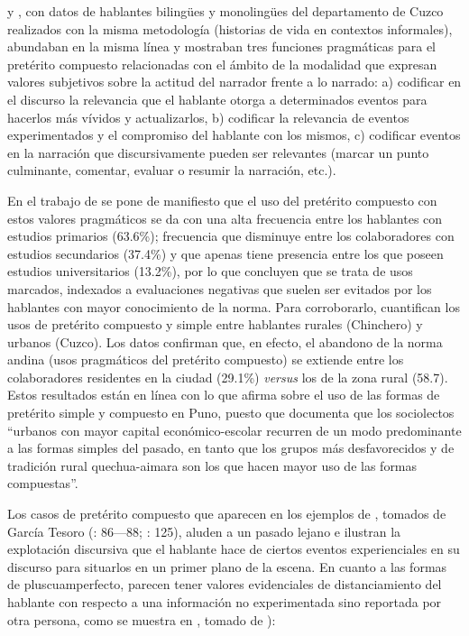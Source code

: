 \documentclass[output=paper]{../langscibook}
\begin{document}
\citet{GarcíaTesoro2015,GarcíaTesoro2017,GarcíaTesoro2018} y  \citet{GarcíaTesoroJang2018}, con datos de hablantes bilingües y monolingües del departamento de Cuzco realizados con la misma metodología (historias de vida en contextos informales), abundaban en la misma línea y mostraban tres funciones pragmáticas para el pretérito compuesto relacionadas con el ámbito de la modalidad que expresan valores subjetivos sobre la actitud del narrador frente a lo narrado: a) codificar en el discurso la relevancia que el hablante otorga a determinados eventos para hacerlos más vívidos y actualizarlos, b) codificar la relevancia de eventos experimentados y el compromiso del hablante con los mismos, c) codificar eventos en la narración que discursivamente pueden ser relevantes (marcar un punto culminante, comentar, evaluar o resumir la narración, etc.).

En el trabajo de  \citet[112]{GarcíaTesoroJang2018} se pone de manifiesto que el uso del pretérito compuesto con estos valores pragmáticos se da con una alta frecuencia entre los hablantes con estudios primarios (63.6\%); frecuencia que disminuye entre los colaboradores con estudios secundarios (37.4\%) y que apenas tiene presencia entre los que poseen estudios universitarios (13.2\%), por lo que concluyen que se trata de usos marcados, indexados a evaluaciones negativas que suelen ser evitados por los hablantes con mayor conocimiento de la norma. Para corroborarlo, cuantifican los usos de pretérito compuesto y simple entre hablantes rurales (Chinchero) y urbanos (Cuzco). Los datos confirman que, en efecto, el abandono de la norma andina (usos pragmáticos del pretérito compuesto) se extiende entre los colaboradores residentes en la ciudad (29.1\%) \textit{versus} los de la zona rural (58.7). Estos resultados están en línea con lo que \citet[323]{Godenzzi1986} afirma sobre el uso de las formas de pretérito simple y compuesto en Puno, puesto que documenta que los sociolectos “urbanos con mayor capital económico-escolar recurren de un modo predominante a las formas simples del pasado, en tanto que los grupos más desfavorecidos y de tradición rural quechua-aimara son los que hacen mayor uso de las formas compuestas”.

Los casos de pretérito compuesto que aparecen en los ejemplos de , tomados de García Tesoro (\citeyear{GarcíaTesoro2017}: 86––88; \citeyear{GarcíaTesoro2018}: 125), aluden a un pasado lejano e ilustran la explotación discursiva que el hablante hace de ciertos eventos experienciales en su discurso para situarlos en un primer plano de la escena. En cuanto a las formas de pluscuamperfecto, parecen tener valores evidenciales de distanciamiento del hablante con respecto a una información no experimentada sino reportada por otra persona, como se muestra en , tomado de \citet[62––63]{GarcíaTesoro2015}):
\end{document}
